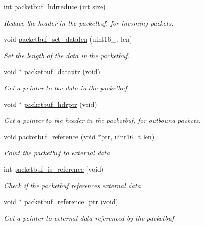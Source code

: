 \begin{DoxyCompactItemize}
\item 
int \hyperlink{group__packetbuf_gad7d9d402f591a560b5502bc6c8bcbd20}{packetbuf\+\_\+hdrreduce} (int size)
\begin{DoxyCompactList}\small\item\em Reduce the header in the packetbuf, for incoming packets. \end{DoxyCompactList}\item 
void \hyperlink{group__packetbuf_ga236b0d557fe119c39796432484c94b26}{packetbuf\+\_\+set\+\_\+datalen} (uint16\+\_\+t len)
\begin{DoxyCompactList}\small\item\em Set the length of the data in the packetbuf. \end{DoxyCompactList}\item 
void $\ast$ \hyperlink{group__packetbuf_ga29a6f3f230b55e6bc2f017879c27113a}{packetbuf\+\_\+dataptr} (void)
\begin{DoxyCompactList}\small\item\em Get a pointer to the data in the packetbuf. \end{DoxyCompactList}\item 
void $\ast$ \hyperlink{group__packetbuf_ga67c213a97ab9bdadddd90db1df0a3058}{packetbuf\+\_\+hdrptr} (void)
\begin{DoxyCompactList}\small\item\em Get a pointer to the header in the packetbuf, for outbound packets. \end{DoxyCompactList}\item 
void \hyperlink{group__packetbuf_ga3f5025b223cc3cf94a7645dd4a3e1819}{packetbuf\+\_\+reference} (void $\ast$ptr, uint16\+\_\+t len)
\begin{DoxyCompactList}\small\item\em Point the packetbuf to external data. \end{DoxyCompactList}\item 
int \hyperlink{group__packetbuf_gac861e157b35ff95f7fd2c7fa925edd58}{packetbuf\+\_\+is\+\_\+reference} (void)
\begin{DoxyCompactList}\small\item\em Check if the packetbuf references external data. \end{DoxyCompactList}\item 
void $\ast$ \hyperlink{group__packetbuf_gadb970d1a23b7bc7c8e18d45a9c9dd579}{packetbuf\+\_\+reference\+\_\+ptr} (void)
\begin{DoxyCompactList}\small\item\em Get a pointer to external data referenced by the packetbuf. \end{DoxyCompactList}\item 

\end{DoxyCompactItemize}
